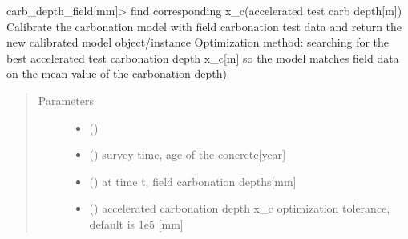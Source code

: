 \documentclass[letterpaper,10pt,english]{sphinxmanual}
\begin{document}

\begin{fulllineitems}
\label{\detokenize{carbonation:carbonation.calibrate_f}}
\sphinxAtStartPar
carb\_depth\_field{[}mm{]}\sphinxhyphen{}\textgreater{} find corresponding x\_c(accelerated test carb depth{[}m{]})
Calibrate the carbonation model with field carbonation test data and return the new calibrated model object/instance
Optimization method: searching for the best accelerated test carbonation depth x\_c{[}m{]} so the model matches field data
on the mean value of the carbonation depth)
\begin{quote}\begin{description}
\item[{Parameters}] \leavevmode\begin{itemize}
\item {} 
\sphinxAtStartPar
{} (\sphinxstyleliteralemphasis{\sphinxupquote{, }}\sphinxstyleliteralemphasis{\sphinxupquote{, }}) \textendash{} 

\item {} 
\sphinxAtStartPar
{} () \textendash{} survey time, age of the concrete{[}year{]}

\item {} 
\sphinxAtStartPar
{} () \textendash{} at time t, field carbonation depths{[}mm{]}

\item {} 
\sphinxAtStartPar
{} () \textendash{} accelerated carbonation depth x\_c optimization tolerance, default is 1e\sphinxhyphen{}5 {[}mm{]}


\end{itemize}
\end{description}
\end{quote}
\end{fulllineitems}
\end{document}

